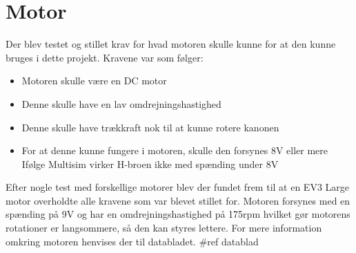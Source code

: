 \section{Motor}
Der blev testet og stillet krav for hvad motoren skulle kunne for at den kunne bruges i dette projekt. 
Kravene var som følger:
	\begin{itemize}
		\item	Motoren skulle være en DC motor
		\item   Denne skulle have en lav omdrejningshastighed
		\item	Denne skulle have trækkraft nok til at kunne rotere kanonen
		\item	For at denne kunne fungere i motoren, skulle den forsynes 8V eller mere 
		\subitem Ifølge Multisim virker H-broen ikke med spænding under 8V
	\end{itemize}
Efter nogle test med forskellige motorer blev der fundet frem til at en EV3 Large motor overholdte alle kravene som var blevet stillet for. Motoren forsynes med en spænding på 9V og har en omdrejningshastighed på 175rpm hvilket gør motorens rotationer er langsommere, så den kan styres lettere. For mere information omkring motoren henvises der til databladet. \#ref datablad

